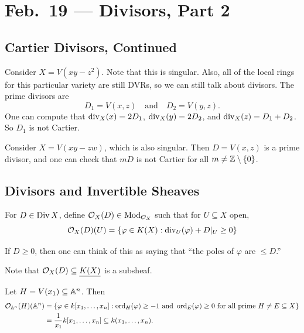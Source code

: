 \chapter{Feb.~19 --- Divisors, Part 2}

\section{Cartier Divisors, Continued}

\begin{example}
  Consider $X = V(xy - z^2)$.
  Note that this is singular. Also, all
  of the local rings for this particular
  variety are still DVRs, so we can
  still talk about divisors. The prime
  divisors are
  \[
    D_1 = V(x, z)
    \quad\text{and}\quad
    D_2 = V(y, z).
  \]
  One can compute that
  $\operatorname{div}_X(x) = 2D_1$,
  $\operatorname{div}_X(y) = 2D_2$, and
  $\operatorname{div}_X(z) = D_1 + D_2$.
  So $D_1$ is not Cartier.
\end{example}

\begin{example}
  Consider $X = V(xy - zw)$, which is
  also singular. Then
  $D = V(x, z)$ is a prime divisor, and
  one can check that $mD$ is not
  Cartier for all $m \ne \mathbb{Z} \setminus \{0\}$.
\end{example}

\section{Divisors and Invertible Sheaves}

\begin{definition}
  For $D \in \operatorname{Div} X$, define
  $\mathcal{O}_X(D) \in \mathrm{Mod}_{\mathcal{O}_X}$
  such that for $U \subseteq X$ open,
  \[
    \mathcal{O}_X(D)(U)
    = \{
      \varphi \in K(X) :
      \operatorname{div}_U(\varphi) + D|_U \ge 0
    \}
  \]
\end{definition}

\begin{remark}
  If $D \ge 0$, then one can think of this
  as saying that ``the poles of $\varphi$
  are $\le D$.''
\end{remark}

\begin{remark}
  Note that $\mathcal{O}_X(D) \subseteq
  \underline{K(X)}$ is a subsheaf.
\end{remark}

\begin{example}
  Let $H = V(x_1) \subseteq \mathbb{A}^n$.
  Then
  \begin{align*}
    \mathcal{O}_{\mathbb{A}^n}(H)(\mathbb{A}^n)
    &= \{
      \varphi \in k[x_1, \dots, x_n]
      : \operatorname{ord}_{H}(\varphi) \ge -1
      \text{ and }
      \operatorname{ord}_E(\varphi) \ge 0
      \text{ for all prime $H \ne E
      \subseteq X$}
    \} \\
    &= \frac{1}{x_1} k[x_1, \dots, x_n]
    \subseteq k(x_1, \dots, x_n).
  \end{align*}
\end{example}

